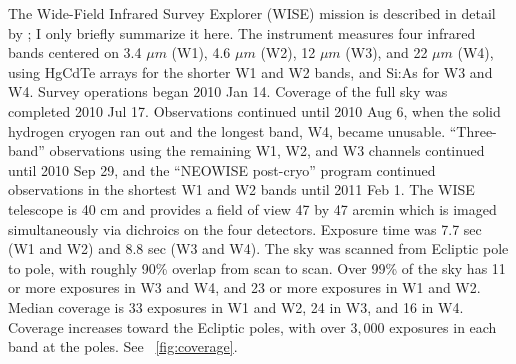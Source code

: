 \documentclass[11pt,preprint]{aastex}
\newcommand{\figref}[1]{\figurename~\ref{#1}}
\newcommand{\thou}{,\!000}
\begin{document}
The Wide-Field Infrared Survey Explorer (WISE) mission is described in
detail by \citet{wright}; I only briefly summarize it here.  The
instrument measures four infrared bands centered on 3.4 $\mu m$ (W1),
4.6 $\mu m$ (W2), 12 $\mu m$ (W3), and 22 $\mu m$ (W4), using HgCdTe
arrays for the shorter W1 and W2 bands, and Si:As for W3 and W4.
Survey operations began 2010 Jan 14.  Coverage of the full sky was
completed 2010 Jul 17.  Observations continued until 2010 Aug 6, when
the solid hydrogen cryogen ran out and the longest band, W4, became
unusable.  ``Three-band'' observations using the remaining W1, W2, and
W3 channels continued until 2010 Sep 29, and the ``NEOWISE post-cryo''
program \citep{mainzer} continued observations in the shortest W1 and
W2 bands until 2011 Feb 1.  The WISE telescope is 40 cm and provides a
field of view 47 by 47 arcmin which is imaged simultaneously via
dichroics on the four detectors.  Exposure time was 7.7 sec (W1 and
W2) and 8.8 sec (W3 and W4).  The sky was scanned from Ecliptic pole
to pole, with roughly 90\% overlap from scan to scan.  Over 99\% of
the sky has 11 or more exposures in W3 and W4, and 23 or more
exposures in W1 and W2.  Median coverage is 33 exposures in W1 and W2,
24 in W3, and 16 in W4.  Coverage increases toward the Ecliptic poles,
with over $3\thou$ exposures in each band at the poles.  See
\figref{fig:coverage}.

%
\end{document}
